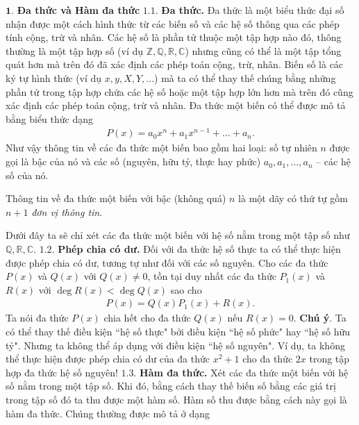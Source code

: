 \begin{multicols}{2}
	$\pmb{1.}$ \textbf{\color{hoccungpi}Đa thức và Hàm đa thức} 
	\vskip 0.1cm
	$\pmb{1.1.}$ \textbf{\color{hoccungpi}Đa thức.}
	Đa thức là một biểu thức đại số nhận được một cách hình thức từ các {\color{blue} biến số} và các {\color{blue} hệ số} thông qua các phép tính cộng, trừ và nhân. 
	\vskip 0.1cm
	Các hệ số là phần tử thuộc một tập hợp nào đó, thông thường là một tập hợp số (ví dụ $\mathbb {Z, Q, R, C}$) nhưng cũng có thể là một tập tổng quát hơn mà trên đó đã xác định các phép toán cộng, trừ, nhân. 
	\vskip 0.1cm
	Biến số là các ký tự hình thức (ví dụ $x,y,X,Y,...$) mà ta có thể thay thế chúng bằng những phần tử trong tập hợp chứa các hệ số hoặc một tập hợp lớn hơn mà trên đó cũng xác định các phép toán cộng, trừ và nhân.
	\vskip 0.1cm
	Đa thức một biến có thể được mô tả bằng biểu thức dạng
	\begin{align*}
		P(x)=a_0x^n+a_1x^{n-1}+\ldots+a_n.
	\end{align*}
	Như vậy thông tin về các đa thức một biến bao gồm hai loại: số tự nhiên $n$ được gọi là bậc của nó và các số (nguyên, hữu tỷ, thực hay phức) $a_0,a_1,\ldots, a_n$ -- các hệ số của nó. 
	\begin{tBox}
		Thông tin về đa thức một biến với bậc (không quá) $n$ là một dãy có thứ tự gồm $n+1$ {\em đơn vị thông tin}.
	\end{tBox}
	Dưới đây ta sẽ chỉ xét các {\color{blue} đa thức một biến} với hệ số nằm trong một tập số như $\mathbb{Q, R, C}$. 
	\vskip 0.1cm	
	$\pmb{1.2.}$ \textbf{\color{hoccungpi}Phép chia có dư.}  
	Đối với đa thức hệ số thực ta có thể thực hiện được phép chia có dư, tương tự như đối với các số nguyên. Cho các đa thức $P(x)$ và $Q(x)$ với $Q(x)\neq 0$, tồn tại duy nhất các đa thức $P_1(x)$ và $R(x)$ với $\deg R(x)<\deg Q(x)$ sao cho
	\begin{align*}
		P(x)= Q(x)P_1(x)+R(x).
	\end{align*}
	Ta nói đa thức $P(x)$ chia hết cho đa thức $Q(x)$ nếu $R(x)=0$.   
	\vskip 0.1cm
	\textbf{\color{hoccungpi}Chú ý}. Ta có thể thay thế điều kiện ``hệ số thực" bởi điều kiện ``hệ số phức" hay ``hệ số hữu tỷ". Nhưng ta không thể áp dụng với điều kiện ``hệ số nguyên". 
	\vskip 0.1cm
	Ví dụ, ta không thể thực hiện được phép chia có dư của đa thức $x^2+1$ cho đa thức $2x$ {\color{blue}trong tập hợp đa thức hệ số nguyên}!
	\vskip 0.1cm
	$\pmb{1.3.}$ \textbf{\color{hoccungpi}Hàm đa thức.}
	Xét các đa thức một biến với hệ số nằm trong một tập số. Khi đó, bằng cách thay thế biến số bằng các giá trị trong tập số đó ta thu được một hàm số. Hàm số thu được bằng cách này gọi là {\color{blue}hàm đa thức}. Chúng thường được mô tả ở dạng

\end{multicols}
